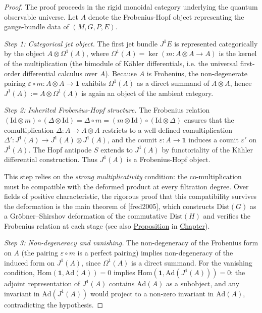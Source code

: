 \begin{proof}
The proof proceeds in the rigid monoidal category underlying the quantum
observable universe.  Let $A$ denote the Frobenius-Hopf object
representing the gauge-bundle data of $(M,G,P,E)$.

\emph{Step 1: Categorical jet object.}
The first jet bundle $J^1 E$ is represented categorically by the object
$A \otimes \Omega^1(A)$, where
$\Omega^1(A) = \ker(m\colon A\otimes A \to A)$
is the kernel of the multiplication (the bimodule of Kähler
differentials, i.e. the universal first-order differential calculus
over $A$).
Because $A$ is Frobenius, the non-degenerate pairing
$\varepsilon \circ m \colon A \otimes A \to \mathbf{1}$ exhibits
$\Omega^1(A)$ as a direct summand of $A \otimes A$, hence
$J^1(A) := A \otimes \Omega^1(A)$ is again an object of the ambient
category.

\emph{Step 2: Inherited Frobenius-Hopf structure.}
The Frobenius relation
$(\mathrm{Id} \otimes m) \circ (\Delta \otimes \mathrm{Id})
 = \Delta \circ m
 = (m \otimes \mathrm{Id}) \circ (\mathrm{Id} \otimes \Delta)$
ensures that the comultiplication $\Delta\colon A \to A \otimes A$ restricts
to a well-defined comultiplication
$\Delta'\colon J^1(A) \to J^1(A) \otimes J^1(A)$, and the counit
$\varepsilon\colon A \to \mathbf{1}$ induces a counit $\varepsilon'$ on
$J^1(A)$.  The Hopf antipode $S$ extends to $J^1(A)$ by functoriality of the
Kähler differential construction.  Thus $J^1(A)$ is a Frobenius-Hopf object.

This step relies on the \emph{strong multiplicativity} condition: the
co-multiplication must be compatible with the deformed product at every
filtration degree.  Over fields of positive characteristic, the
rigorous proof that this compatibility survives the deformation is the
main theorem of [fred2005], which constructs $\mathrm{Dist}(G)$
as a Gröbner--Shirshov deformation of the commutative
$\mathrm{Dist}(H)$ and verifies the Frobenius relation at each stage
(see also \hyperref[prop:skew-poisson-integration]{Proposition} in
\hyperref[chap:p-adic]{Chapter}).

\emph{Step 3: Non-degeneracy and vanishing.}
The non-degeneracy of the Frobenius form on $A$ (the pairing
$\varepsilon \circ m$ is a perfect pairing) implies non-degeneracy of the
induced form on $J^1(A)$, since $\Omega^1(A)$ is a direct summand.
For the vanishing condition, $\mathrm{Hom}(\mathbf{1}, \mathrm{Ad}(A)) = 0$
implies $\mathrm{Hom}(\mathbf{1}, \mathrm{Ad}(J^1(A))) = 0$: the adjoint
representation of $J^1(A)$ contains $\mathrm{Ad}(A)$ as a subobject, and any
invariant in $\mathrm{Ad}(J^1(A))$ would project to a non-zero invariant in
$\mathrm{Ad}(A)$, contradicting the hypothesis.


\end{proof}
